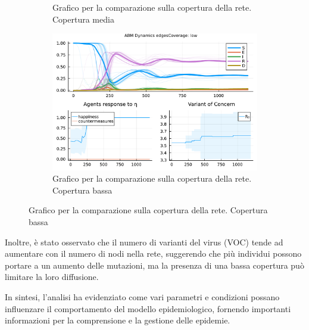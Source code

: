\begin{figure}[!hb]
\begin{subfigure}[b]{0.3\textwidth}
		\caption{Grafico per la comparazione sulla copertura della rete. Copertura media}
		\label{fig:comparison_mediumCoverage}
	\end{subfigure}
	\hfill
	\begin{subfigure}[b]{0.3\textwidth}
		\centering
		\includegraphics[width=\textwidth]{img/SocialNetworkABM_3_EC.pdf}
		\caption{Grafico per la comparazione sulla copertura della rete. Copertura bassa}
		\label{fig:comparison_lowCoverage}
	\end{subfigure}
\end{figure}

Inoltre, è stato osservato che il numero di varianti del virus 
(VOC) tende ad aumentare con il numero di nodi nella rete, 
suggerendo che più individui possono portare a un aumento delle 
mutazioni, ma la presenza di una bassa copertura può limitare la 
loro diffusione.

In sintesi, l'analisi ha evidenziato come vari parametri e 
condizioni possano influenzare il comportamento del modello 
epidemiologico, fornendo importanti informazioni per la 
comprensione e la gestione delle epidemie.